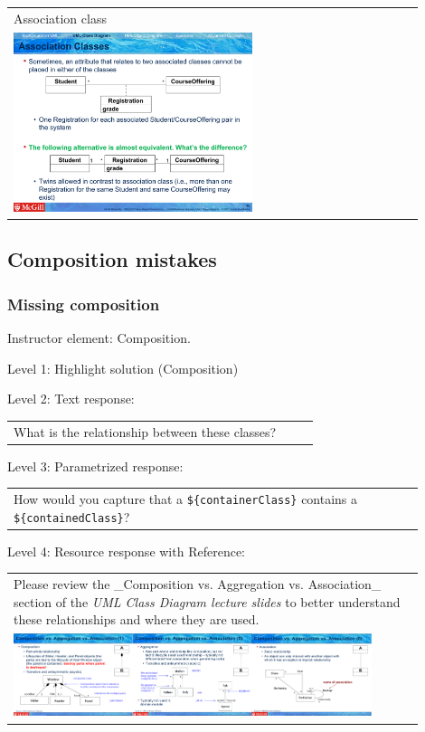 \begin{tabular}{|p{0.9\linewidth}}
Association class

\\
\includegraphics[width=0.6\textwidth]{images/association_class.png}
\end{tabular} \medskip


\subsection{Composition mistakes}

\subsubsection{Missing composition}

Instructor element: Composition. \medskip

\noindent Level 1: Highlight solution (Composition) \medskip

\noindent Level 2: Text response: \medskip

\begin{tabular}{|p{0.9\linewidth}}
What is the relationship between these classes?
\end{tabular} \medskip

\noindent Level 3: Parametrized response: \medskip

\begin{tabular}{|p{0.9\linewidth}}
How would you capture that a \verb|${containerClass}| contains a \verb|${containedClass}|?
\end{tabular} \medskip

\noindent Level 4: Resource response with Reference: \medskip

\begin{tabular}{|p{0.9\linewidth}}
Please review the _Composition vs. Aggregation vs. Association_ section of 
the \textit{UML Class Diagram lecture slides} to 
better understand these relationships and where they are used.

\\
\includegraphics[width=0.9\textwidth]{images/composition_aggregation_association.png}
\end{tabular} \medskip


